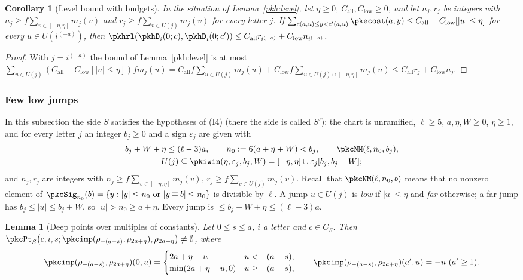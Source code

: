 \documentclass[10pt]{amsart}
\newtheorem{lemma}[theorem]{Lemma}
\newtheorem{corollary}[theorem]{Corollary}
\theoremstyle{definition}
\theoremstyle{remark}
\begin{document}
\begin{corollary}[Level bound with budgets]\label{pkh:levelcor}
In the situation of Lemma~\ref{pkh:level}, let $\eta\ge0$, $C_{\mathrm{all}},C_{\mathrm{low}}\ge0$, and let
$n_j,r_j$ be integers with $n_j\ge f\sum_{v\in[-\eta,\eta]}m_j(v)$ and $r_j\ge f\sum_{v\in U(j)}m_j(v)$ for
every letter $j$. If $\sum_{c(a,u)\le y<c'(a,u)}\pkecost(a,y)\le C_{\mathrm{all}}+C_{\mathrm{low}}[|u|\le\eta]$
for every $u\in U(i^{(-a)})$, then $\pkhrl(\pkhD_i(0;c),\pkhD_i(0;c'))\le C_{\mathrm{all}}r_{i^{(-a)}}+
C_{\mathrm{low}}n_{i^{(-a)}}$.
\end{corollary}

\begin{proof}
With $j=i^{(-a)}$ the bound of Lemma~\ref{pkh:level} is at most $\sum_{u\in U(j)}(C_{\mathrm{all}}+C_{\mathrm{low}}
[|u|\le\eta])fm_j(u)=C_{\mathrm{all}}f\sum_{u\in U(j)}m_j(u)+C_{\mathrm{low}}f\sum_{u\in U(j)\cap[-\eta,\eta]}
m_j(u)\le C_{\mathrm{all}}r_j+C_{\mathrm{low}}n_j$.
\end{proof}

\subsubsection{Few low jumps}\label{pkh:ss-few}

In this subsection the side $S$ satisfies the hypotheses of (I4) (there the side is called $S'$): the chart is
unramified, $\ell\ge5$, $a,\eta,W\ge0$, $\eta\ge1$, and for every letter $j$ an integer $b_j\ge0$ and a sign
$\varepsilon_j$ are given with
\[
\begin{gathered}b_j+W+\eta\le(\ell-3)a,\qquad n_0:=6(a+\eta+W)<b_j,\qquad\pkcNM(\ell,n_0,b_j),\\ U(j)\subseteq
\pkiWin(\eta,\varepsilon_j,b_j,W)=[-\eta,\eta]\cup\varepsilon_j[b_j,b_j+W];\end{gathered}
\]
and $n_j,r_j$ are integers with $n_j\ge f\sum_{v\in[-\eta,\eta]}m_j(v)$, $r_j\ge f\sum_{v\in U(j)}m_j(v)$. Recall
that $\pkcNM(\ell,n_0,b)$ means that no nonzero element of $\pkcSig_{n_0}(b)=\{y:|y|\le n_0\text{ or }|y\mp b|\le
n_0\}$ is divisible by $\ell$. A jump $u\in U(j)$ is \emph{low} if $|u|\le\eta$ and \emph{far} otherwise; a far
jump has $b_j\le|u|\le b_j+W$, so $|u|>n_0\ge a+\eta$. Every jump is $\le b_j+W+\eta\le(\ell-3)a$.

\begin{lemma}[Deep points over multiples of constants]\label{pkh:points}
Let $0\le s\le a$, $i$ a letter and $c\in C_S$. Then
$\pkcPt_S\bigl(c,i,s;\pkcimp(\rho_{-(a-s)},\rho_{2a+\eta}),\rho_{2a+\eta}\bigr)\ne\emptyset$, where
\[
\pkcimp(\rho_{-(a-s)},\rho_{2a+\eta})(0,u)=\begin{cases}2a+\eta-u&u<-(a-s),\\ \min(2a+\eta-u,0)&u\ge-(a-s),
\end{cases}\qquad \pkcimp(\rho_{-(a-s)},\rho_{2a+\eta})(a',u)=-u\ (a'\ge1).
\]
\end{lemma}
\end{document}
